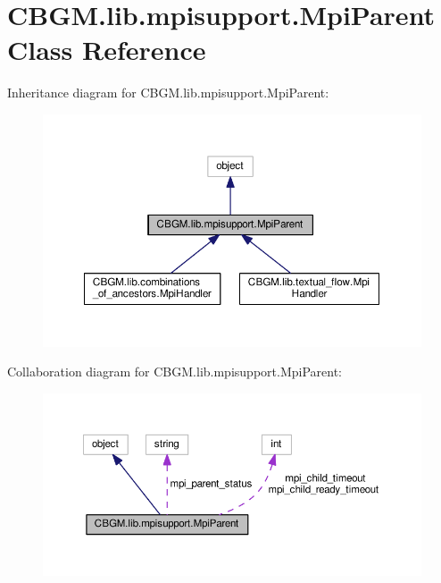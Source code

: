 \hypertarget{classCBGM_1_1lib_1_1mpisupport_1_1MpiParent}{}\section{C\+B\+G\+M.\+lib.\+mpisupport.\+Mpi\+Parent Class Reference}
\label{classCBGM_1_1lib_1_1mpisupport_1_1MpiParent}


Inheritance diagram for C\+B\+G\+M.\+lib.\+mpisupport.\+Mpi\+Parent\+:
\nopagebreak
\begin{figure}[H]
\begin{center}
\leavevmode
\includegraphics[width=350pt]{classCBGM_1_1lib_1_1mpisupport_1_1MpiParent__inherit__graph}
\end{center}
\end{figure}


Collaboration diagram for C\+B\+G\+M.\+lib.\+mpisupport.\+Mpi\+Parent\+:
\nopagebreak
\begin{figure}[H]
\begin{center}
\leavevmode
\includegraphics[width=350pt]{classCBGM_1_1lib_1_1mpisupport_1_1MpiParent__coll__graph}
\end{center}
\end{figure}
